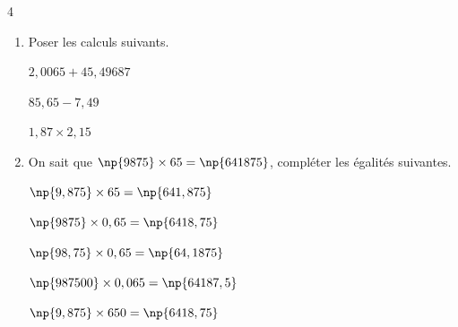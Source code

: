 \documentclass[a4paper]{book}
\begin{document}
{    \begin{exerciceNote}{4}
        \begin{enumerate}
            \item Poser les calculs suivants.

            \medskip
        
            \begin{minipage}{0.33\linewidth}
                \quad $2,0065+45,49687$

                \medskip
                
            \end{minipage}
            \hfill\vline\hfill
            \begin{minipage}{0.33\linewidth}
                \quad $85,65-7,49$

                \medskip

                \quad {}         
            \end{minipage}        
            \hfill\vline\hfill
            \begin{minipage}{0.33\linewidth}
                \quad $1,87 \times 2,15 $

                \medskip

                \quad {}
            \end{minipage}

            \item On sait que $\np{9875}\times65=\np{641875}$, compléter les égalités suivantes.

            \medskip
        
            \begin{minipage}{0.33\linewidth}
                $\np{9,875}\times65=\np{641,875}$
                
                \bigskip
                
                 $\np{9875}\times0,65=\np{6418,75}$
            \end{minipage}
            \hfill\vline\hfill
            \begin{minipage}{0.33\linewidth}
                \quad $\np{98,75}\times0,65=\np{64,1875}$
                
                \bigskip
                
                 \quad $\np{987500}\times0,065=\np{64187,5}$
            \end{minipage}        
            \hfill\vline\hfill
            \begin{minipage}{0.33\linewidth}
                \quad $\np{9,875}\times650=\np{6418,75}$
                

\end{minipage}
\end{enumerate}
\end{exerciceNote}}
\end{document}
